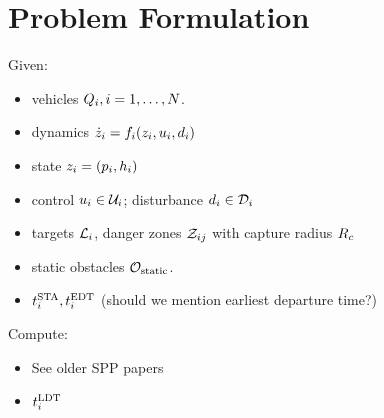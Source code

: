 \section{Problem Formulation \label{sec:formulation}}
Given:
\begin{itemize}
\item vehicles $Q_{i}, i = 1, \ldots, N$.
\item dynamics $\dot{z}_i = f_i(z_i, u_i, d_i)$
\item state $z_i = (p_i, h_i)$
\item control $u_i \in \mathcal{U}_i$; disturbance $d_i \in \mathcal{D}_i$
\item targets $\mathcal{L}_i$, danger zones $\mathcal{Z}_{ij}$ with capture radius $R_c$
\item static obstacles $\mathcal{O}_\text{static}$.
\item $t^\text{STA}_i, t^\text{EDT}_i$ (should we mention earliest departure time?)
\end{itemize}

Compute:
\begin{itemize}
\item See older SPP papers
\item $t^\text{LDT}_i$
\end{itemize}